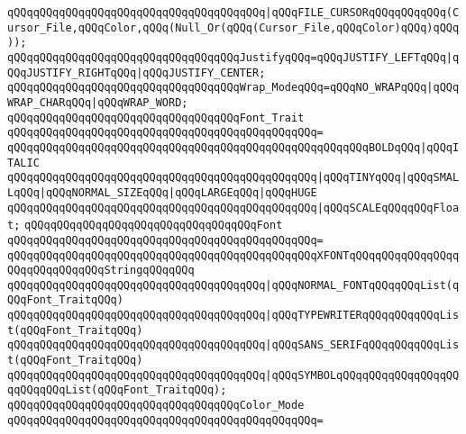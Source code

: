 \verb|qQQqqQQqqQQqqQQqqQQqqQQqqQQqqQQqqQQqqQQq|\verb#|qQQqFILE_CURSORqQQqqQQqqQQq(Cursor_File,qQQqColor,qQQq(Null_Or(qQQq(Cursor_File,qQQqColor)qQQq)qQQq));#\newline
\newline
\verb|qQQqqQQqqQQqqQQqqQQqqQQqqQQqqQQqqQQqJustifyqQQq=qQQqJUSTIFY_LEFTqQQq|\verb#|qQQqJUSTIFY_RIGHTqQQq|qQQqJUSTIFY_CENTER;#\newline
\newline
\verb|qQQqqQQqqQQqqQQqqQQqqQQqqQQqqQQqqQQqWrap_ModeqQQq=qQQqNO_WRAPqQQq|\verb#|qQQqWRAP_CHARqQQq|qQQqWRAP_WORD;#\newline
\newline
\verb|qQQqqQQqqQQqqQQqqQQqqQQqqQQqqQQqqQQqFont_Trait|\newline
\verb|qQQqqQQqqQQqqQQqqQQqqQQqqQQqqQQqqQQqqQQqqQQqqQQq=|\newline
\verb|qQQqqQQqqQQqqQQqqQQqqQQqqQQqqQQqqQQqqQQqqQQqqQQqqQQqqQQqBOLDqQQq|\verb#|qQQqITALIC#\newline
\verb|qQQqqQQqqQQqqQQqqQQqqQQqqQQqqQQqqQQqqQQqqQQqqQQq|\verb#|qQQqTINYqQQq|qQQqSMALLqQQq|qQQqNORMAL_SIZEqQQq|qQQqLARGEqQQq|qQQqHUGE#\newline
\verb|qQQqqQQqqQQqqQQqqQQqqQQqqQQqqQQqqQQqqQQqqQQqqQQq|\verb#|qQQqSCALEqQQqqQQqFloat;#\newline
\newline
\verb|qQQqqQQqqQQqqQQqqQQqqQQqqQQqqQQqqQQqFont|\newline
\verb|qQQqqQQqqQQqqQQqqQQqqQQqqQQqqQQqqQQqqQQqqQQqqQQq=|\newline
\verb|qQQqqQQqqQQqqQQqqQQqqQQqqQQqqQQqqQQqqQQqqQQqqQQqXFONTqQQqqQQqqQQqqQQqqQQqqQQqqQQqqQQqStringqQQqqQQq|\newline
\verb|qQQqqQQqqQQqqQQqqQQqqQQqqQQqqQQqqQQqqQQq|\verb#|qQQqNORMAL_FONTqQQqqQQqList(qQQqFont_TraitqQQq)#\newline
\verb|qQQqqQQqqQQqqQQqqQQqqQQqqQQqqQQqqQQqqQQq|\verb#|qQQqTYPEWRITERqQQqqQQqqQQqList(qQQqFont_TraitqQQq)#\newline
\verb|qQQqqQQqqQQqqQQqqQQqqQQqqQQqqQQqqQQqqQQq|\verb#|qQQqSANS_SERIFqQQqqQQqqQQqList(qQQqFont_TraitqQQq)#\newline
\verb|qQQqqQQqqQQqqQQqqQQqqQQqqQQqqQQqqQQqqQQq|\verb#|qQQqSYMBOLqQQqqQQqqQQqqQQqqQQqqQQqqQQqList(qQQqFont_TraitqQQq);#\newline
\newline
\verb|qQQqqQQqqQQqqQQqqQQqqQQqqQQqqQQqqQQqColor_Mode|\newline
\verb|qQQqqQQqqQQqqQQqqQQqqQQqqQQqqQQqqQQqqQQqqQQqqQQq=|\newline
